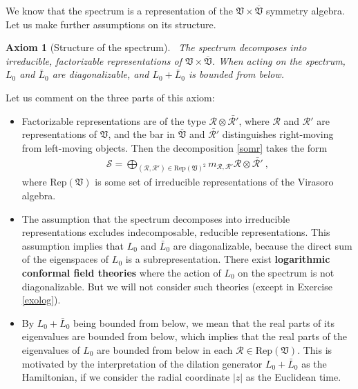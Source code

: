 \documentclass[12pt, a4paper, notitlepage, twoside]{report}
\numberwithin{equation}{section}
\theoremstyle{break}
\newtheorem{hyp}{Axiom}[chapter]
\begin{document}
We know that the spectrum is a representation of the 
$\mathfrak{V}\times \overline{\mathfrak{V}}$ symmetry algebra.
Let us make further assumptions on its structure.

\begin{hyp}[Structure of the spectrum]
 ~\label{ax:sots}
 The spectrum decomposes into irreducible, factorizable representations of $\mathfrak{V}\times \overline{\mathfrak{V}}$. When acting on the spectrum, $L_0$ and $\bar L_0$ are diagonalizable, and $L_0+\bar L_0$ is bounded from below.
\end{hyp} 
\noindent
Let us comment on the three parts of this axiom:
\begin{itemize}
 \item 
 Factorizable representations are of the type $\mathcal{R}\otimes \bar{\mathcal{R}'}$, where $\mathcal{R}$ and $\mathcal{R}'$ are representations of $\mathfrak{V}$, and the bar in $\overline{\mathfrak{V}}$ and $\bar{\mathcal{R}'}$ distinguishes right-moving from left-moving objects. 
Then the decomposition \eqref{somr} takes the form
\begin{align}
 \boxed{\mathcal{S} = \bigoplus_{(\mathcal{R},\mathcal{R}')\in \text{Rep}(\mathfrak{V})^2} m_{\mathcal{R},\mathcal{R}'} \mathcal{R}\otimes \bar{\mathcal{R}'}}\ ,
\label{sorr}
\end{align}
where $\text{Rep}(\mathfrak{V})$ is some set of irreducible representations of the Virasoro algebra.
\item
The assumption that the spectrum decomposes into irreducible representations excludes indecomposable, reducible representations. This assumption implies that $L_0$ and $\bar L_0$ are diagonalizable, because the direct sum of the eigenspaces of $L_0$ is a subrepresentation.
There exist \textbf{\boldmath logarithmic conformal field theories} where the action of $L_0$ on the spectrum is not diagonalizable. 
But we will not consider such theories (except in Exercise \ref{exolog}).
\item 
By $L_0+\bar L_0$ being bounded from below, we mean that the real parts of its eigenvalues are bounded from below, which implies that the real parts of the eigenvalues of $L_0$ are bounded from below in each $\mathcal{R}\in\text{Rep}(\mathfrak{V})$. 
This is motivated by the interpretation of the dilation generator $L_0+\bar L_0$ as the Hamiltonian, if we consider the radial coordinate $|z|$ as the Euclidean time. 
\end{itemize}
\end{document}
